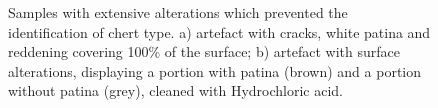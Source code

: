 \documentclass[
  a4paper,
  DIV=11,
  numbers=noendperiod]{scrreprt}
\begin{document}
\begin{figure}


\caption{\label{fig-terrace-alterations}Samples with extensive
alterations which prevented the identification of chert type. a)
artefact with cracks, white patina and reddening covering 100\% of the
surface; b) artefact with surface alterations, displaying a portion with
patina (brown) and a portion without patina (grey), cleaned with
Hydrochloric acid.}

\end{figure}%
\end{document}
